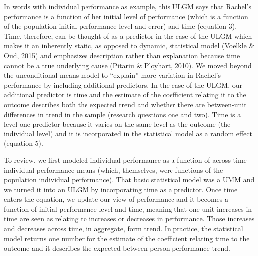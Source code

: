 \documentclass[english,,man]{apa6}
\begin{document}
In words with individual performance as example, this ULGM says that Rachel's performance is a function of her initial level of performance (which is a function of the population initial performance level and error) and time (equation 3). Time, therefore, can be thought of as a predictor in the case of the ULGM which makes it an inherently static, as opposed to dynamic, statistical model (Voelkle \& Oud, 2015) and emphasizes description rather than explanation because time cannot be a true underlying cause (Pitariu \& Ployhart, 2010). We moved beyond the unconditional means model to \enquote{explain} more variation in Rachel's performance by including additional predictors. In the case of the ULGM, our additional predictor is time and the estimate of the coefficient relating it to the outcome describes both the expected trend and whether there are between-unit differences in trend in the sample (research questions one and two). Time is a level one predictor because it varies on the same level as the outcome (the individual level) and it is incorporated in the statistical model as a random effect (equation 5).

To review, we first modeled individual performance as a function of across time individual performance means (which, themselves, were functions of the population individual performance). That basic statistical model was a UMM and we turned it into an ULGM by incorporating time as a predictor. Once time enters the equation, we update our view of performance and it becomes a function of initial performance level and time, meaning that one-unit increases in time are seen as relating to increases or decreases in performance. Those increases and decreases across time, in aggregate, form trend. In practice, the statistical model returns one number for the estimate of the coefficient relating time to the outcome and it describes the expected between-person performance trend.
\end{document}
